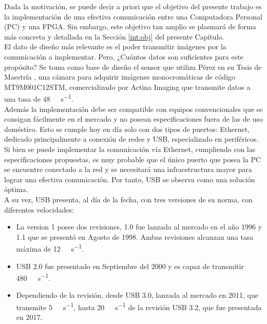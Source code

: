 Dada la motivación, se puede decir a priori que el objetivo del presente trabajo es la implementación de una efectiva comunicación entre una Computadora Personal (PC) y una FPGA. Sin embargo, este objetivo tan amplio se plasmará de forma más concreta y detallada en la Sección \ref{int:obj} del presente Capítulo.\\

El dato de diseño más relevante es el poder transmitir imágenes por la comunicación a implementar. Pero, ¿Cuántos datos son suficientes para este propósito? Se toma como base de diseño el sensor que utiliza Pérez en su Tesis de Maestría \cite{Perez2018}, una cámara para adquirir imágenes monocromáticas de código MT9M001C12STM, comercializado por Actina Imaging \cite{MicronTechnology2004} que transmite datos a una tasa de \SI{48}{\mega\bit\per\second}.\\

Además la implementación debe ser compatible con equipos convencionales que se consigan fácilmente en el mercado y no posean especificaciones fuera de las de uso doméstico. Esto se cumple hoy en día solo con dos tipos de puertos: Ethernet, dedicado principalmente a conexión de redes y USB, especializado en periféricos.\\

Si bien se puede implementar la comunicación vía Ethernet, cumpliendo con las especificaciones propuestas, es muy probable que el único puerto que posea la PC se encuentre conectado a la red y se necesitará una infraestructura mayor para lograr una efectiva comunicación. Por tanto, USB se observa como una solución óptima.\\

A su vez, USB presenta, al día de la fecha, con tres versiones de su norma, con diferentes velocidades: 

\begin{itemize}
	\item La version 1 posee dos revisiones, 1.0 fue lanzada al mercado en el año 1996 y 1.1 que se presentó en Agosto de 1998. Ambas revisiones alcanzan una tasa máxima de \SI{12}{\mega\bit\per\second}. 
	\item USB 2.0 fue presentado en Septiembre del 2000 y es capaz de transmitir \SI{480}{\mega\bit\per\second}.
	\item Dependiendo de la revisión, desde USB 3.0, lanzada al mercado en 2011, que transmite \SI{5}{\giga\bit\per\second}, hasta \SI{20}{\giga\bit\per\second} de la revisión USB 3.2, que fue presentada en 2017.
\end{itemize}

